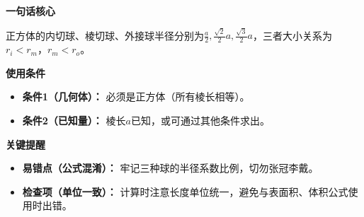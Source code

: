 \begin{summarybox}

	\textbf{\textcolor{CSummary}{一句话核心}}

	正方体的内切球、棱切球、外接球半径分别为$\frac{a}{2}, \frac{\sqrt{2}}{2}a, \frac{\sqrt{3}}{2}a$，三者大小关系为$r_i < r_m$，$r_m < r_o$。

	\medskip
	\textbf{\textcolor{CSummary}{使用条件}}
	\begin{itemize}[leftmargin=*, itemsep=0.5em, topsep=0.4em]
		\item \textbf{条件1（几何体）：} 必须是正方体（所有棱长相等）。
		\item \textbf{条件2（已知量）：} 棱长$a$已知，或可通过其他条件求出。
	\end{itemize}

	\medskip
	\textbf{\textcolor{CSummary}{关键提醒}}
	\begin{itemize}[leftmargin=*, itemsep=0.5em, topsep=0.4em]
		\item \textbf{易错点（公式混淆）：} 牢记三种球的半径系数比例，切勿张冠李戴。
		\item \textbf{检查项（单位一致）：} 计算时注意长度单位统一，避免与表面积、体积公式使用时出错。
	\end{itemize}

\end{summarybox}
